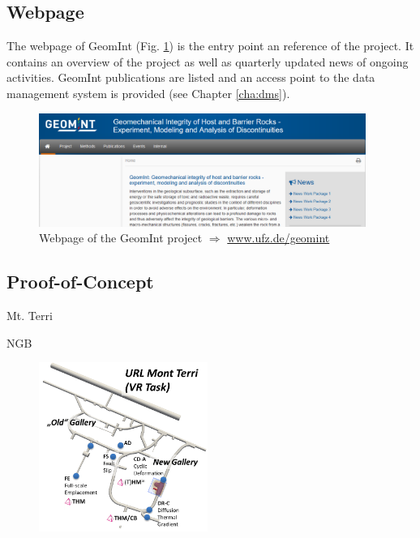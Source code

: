 \subsection*{Webpage}

The webpage of GeomInt (Fig. \ref{fig:geomint-web}) is the entry point an reference of the project. It contains an overview of the project as well as quarterly updated news of ongoing activities. GeomInt publications are listed and an access point to the data management system is provided (see Chapter \ref{cha:dms}).

\begin{figure}[ht!]
\centering
\includegraphics[width=0.95\textwidth]{figures/geomint-web.png}
\caption{Webpage of the GeomInt project $\Rightarrow$ \url{www.ufz.de/geomint}}
\label{fig:geomint-web}
\end{figure}

\clearpage

\subsection*{Proof-of-Concept}

\begin{list}{-}{\leftmargin=1em \itemindent=0em \itemsep=0em}
\item Mt. Terri
\item NGB
\end{list}

\begin{figure}
\vspace{-5mm}
\centering
\includegraphics[width=0.49\textwidth]{figures/mt-vr-01a}
\caption{}
\label{fig:workflows}
\end{figure}
\lipsum[3]

